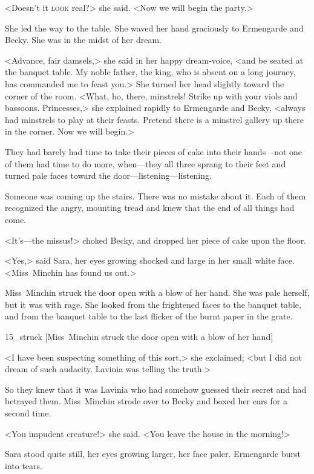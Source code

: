 <Doesn't it \textsc{look} real?> she said. <Now we will begin the party.>

She led the way to the table. She waved her hand graciously to Ermengarde and Becky. She was in the midst of her dream.

<Advance, fair damsels,> she said in her happy dream-voice, <and be seated at the banquet table. My noble father, the king, who is absent on a long journey, has commanded me to feast you.> She turned her head slightly toward the corner of the room. <What, ho, there, minstrels! Strike up with your viols and bassoons. Princesses,> she explained rapidly to Ermengarde and Becky, <always had minstrels to play at their feasts. Pretend there is a minstrel gallery up there in the corner. Now we will begin.>

They had barely had time to take their pieces of cake into their hands—not one of them had time to do more, when—they all three sprang to their feet and turned pale faces toward the door—listening—listening.

Someone was coming up the stairs. There was no mistake about it. Each of them recognized the angry, mounting tread and knew that the end of all things had come.

<It's—the missus!> choked Becky, and dropped her piece of cake upon the floor.

<Yes,> said Sara, her eyes growing shocked and large in her small white face. <Miss~Minchin has found us out.>

Miss~Minchin struck the door open with a blow of her hand. She was pale herself, but it was with rage. She looked from the frightened faces to the banquet table, and from the banquet table to the last flicker of the burnt paper in the grate.

\begin{colorbigpic}
	[\basicscale]
	{15_struck}
	[Miss~Minchin struck the door open with a blow of her hand]
\end{colorbigpic}

<I have been suspecting something of this sort,> she exclaimed; <but I did not dream of such audacity. Lavinia was telling the truth.>

So they knew that it was Lavinia who had somehow guessed their secret and had betrayed them. Miss~Minchin strode over to Becky and boxed her ears for a second time.

<You impudent creature!> she said. <You leave the house in the morning!>

Sara stood quite still, her eyes growing larger, her face paler. Ermengarde burst into tears.

